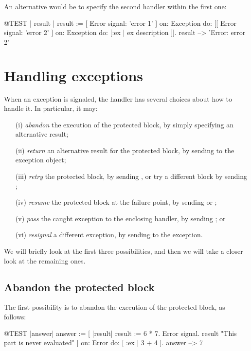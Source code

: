 \documentclass[a4paper,10pt,twoside]{book}
\begin{document}
An alternative would be to specify the second handler within the first one:
\begin{code}{@TEST | result |}
result := [ Error signal: 'error 1' ]
	on: Exception
	do: [[ Error signal: 'error 2' ]
		on: Exception
		do: [:ex | ex description ]].
result --> 'Error: error 2'
\end{code}

\section{Handling exceptions}

When an exception is signaled, the handler has several choices about how to handle it.
In particular, it may:
\begin{itemize}
\item[(i)] \emph{abandon} the execution of the protected block, by simply specifying an alternative result;
\item[(ii)] \emph{return} an alternative result for the protected block, by sending  to the exception object;
\item[(iii)] \emph{retry} the protected block, by sending , or try a different block by sending ;
\item[(iv)] \emph{resume} the protected block at the failure point, by sending  or ;
\item[(v)] \emph{pass} the caught exception to the enclosing handler, by sending ; or
\item[(vi)] \emph{resignal} a different exception, by sending  to the exception.
\end{itemize}

We will briefly look at the first three possibilities, and then we will take a closer look at the remaining ones.

\subsection{Abandon the protected block}

The first possibility is to abandon the execution of the protected block, as follows:
\begin{code}{@TEST |answer|}
answer := [ |result|
	result := 6 * 7.
	Error signal.
	result 	"This part is never evaluated"
]	on: Error
	do: [ :ex | 3 + 4 ].
answer --> 7
\end{code}
\end{document}
